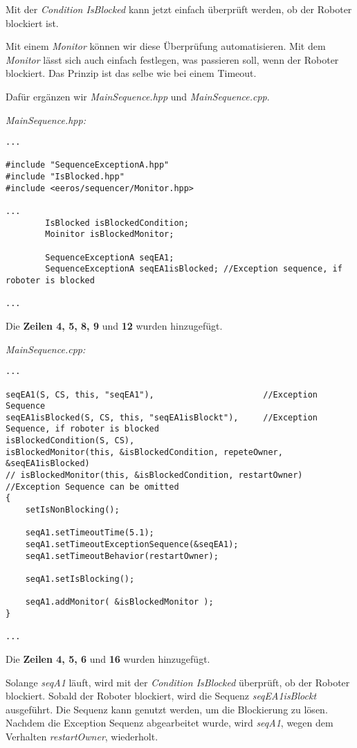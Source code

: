 Mit der \textit{Condition IsBlocked} kann jetzt einfach überprüft werden, ob der Roboter blockiert ist.

Mit einem \textit{Monitor} können wir diese Überprüfung automatisieren.
Mit dem \textit{Monitor} lässt sich auch einfach festlegen, was passieren soll, wenn der Roboter blockiert.
Das Prinzip ist das selbe wie bei einem Timeout.

Dafür ergänzen wir \textit{MainSequence.hpp} und \textit{MainSequence.cpp}.

\textit{MainSequence.hpp:}\
\begin{lstlisting}
...

#include "SequenceExceptionA.hpp"
#include "IsBlocked.hpp"
#include <eeros/sequencer/Monitor.hpp>

...
		IsBlocked isBlockedCondition;
		Moinitor isBlockedMonitor;
		
		SequenceExceptionA seqEA1;
		SequenceExceptionA seqEA1isBlocked;	//Exception sequence, if roboter is blocked
		
...
\end{lstlisting}

Die \textbf{Zeilen 4, 5, 8, 9} und \textbf{12} wurden hinzugefügt.

\textit{MainSequence.cpp:}\
\begin{lstlisting}
...

seqEA1(S, CS, this, "seqEA1"),						//Exception Sequence
seqEA1isBlocked(S, CS, this, "seqEA1isBlockt"),		//Exception Sequence, if roboter is blocked
isBlockedCondition(S, CS),
isBlockedMonitor(this, &isBlockedCondition, repeteOwner, &seqEA1isBlocked)
// isBlockedMonitor(this, &isBlockedCondition, restartOwner)	//Exception Sequence can be omitted
{
	setIsNonBlocking();
	
	seqA1.setTimeoutTime(5.1);
	seqA1.setTimeoutExceptionSequence(&seqEA1);
	seqA1.setTimeoutBehavior(restartOwner);
	
	seqA1.setIsBlocking();
	
	seqA1.addMonitor( &isBlockedMonitor );
}

...
\end{lstlisting}

Die \textbf{Zeilen 4, 5, 6} und \textbf{16} wurden hinzugefügt.

Solange \textit{seqA1} läuft, wird mit der \textit{Condition IsBlocked} überprüft, ob der Roboter blockiert.
Sobald der Roboter blockiert, wird die Sequenz \textit{seqEA1isBlockt} ausgeführt.
Die Sequenz kann genutzt werden, um die Blockierung zu lösen.
Nachdem die Exception Sequenz abgearbeitet wurde, wird \textit{seqA1}, wegen dem Verhalten \textit{restartOwner}, wiederholt.

